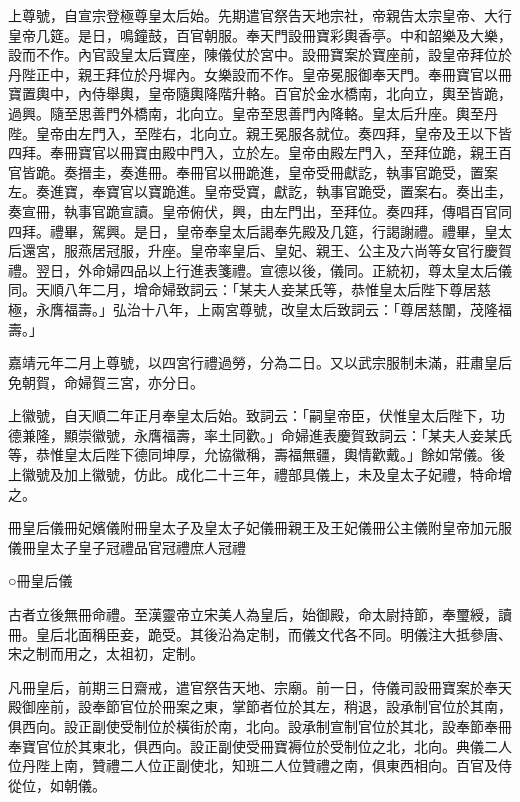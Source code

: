 上尊號，自宣宗登極尊皇太后始。先期遣官祭告天地宗社，帝親告太宗皇帝、大行皇帝几筵。是日，鳴鐘鼓，百官朝服。奉天門設冊寶彩輿香亭。中和韶樂及大樂，設而不作。內官設皇太后寶座，陳儀仗於宮中。設冊寶案於寶座前，設皇帝拜位於丹陛正中，親王拜位於丹墀內。女樂設而不作。皇帝冕服御奉天門。奉冊寶官以冊寶置輿中，內侍舉輿，皇帝隨輿降階升輅。百官於金水橋南，北向立，輿至皆跪，過興。隨至思善門外橋南，北向立。皇帝至思善門內降輅。皇太后升座。輿至丹陛。皇帝由左門入，至陛右，北向立。親王冕服各就位。奏四拜，皇帝及王以下皆四拜。奉冊寶官以冊寶由殿中門入，立於左。皇帝由殿左門入，至拜位跪，親王百官皆跪。奏搢圭，奏進冊。奉冊官以冊跪進，皇帝受冊獻訖，執事官跪受，置案左。奏進寶，奉寶官以寶跪進。皇帝受寶，獻訖，執事官跪受，置案右。奏出圭，奏宣冊，執事官跪宣讀。皇帝俯伏，興，由左門出，至拜位。奏四拜，傳唱百官同四拜。禮畢，駕興。是日，皇帝奉皇太后謁奉先殿及几筵，行謁謝禮。禮畢，皇太后還宮，服燕居冠服，升座。皇帝率皇后、皇妃、親王、公主及六尚等女官行慶賀禮。翌日，外命婦四品以上行進表箋禮。宣德以後，儀同。正統初，尊太皇太后儀同。天順八年二月，增命婦致詞云：「某夫人妾某氏等，恭惟皇太后陛下尊居慈極，永膺福壽。」弘治十八年，上兩宮尊號，改皇太后致詞云：「尊居慈闈，茂隆福壽。」

嘉靖元年二月上尊號，以四宮行禮過勞，分為二日。又以武宗服制未滿，莊肅皇后免朝賀，命婦賀三宮，亦分日。

上徽號，自天順二年正月奉皇太后始。致詞云：「嗣皇帝臣，伏惟皇太后陛下，功德兼隆，顯崇徽號，永膺福壽，率土同歡。」命婦進表慶賀致詞云：「某夫人妾某氏等，恭惟皇太后陛下德同坤厚，允協徽稱，壽福無疆，輿情歡戴。」餘如常儀。後上徽號及加上徽號，仿此。成化二十三年，禮部具儀上，未及皇太子妃禮，特命增之。

冊皇后儀冊妃嬪儀附冊皇太子及皇太子妃儀冊親王及王妃儀冊公主儀附皇帝加元服儀冊皇太子皇子冠禮品官冠禮庶人冠禮

○冊皇后儀

古者立後無冊命禮。至漢靈帝立宋美人為皇后，始御殿，命太尉持節，奉璽綬，讀冊。皇后北面稱臣妾，跪受。其後沿為定制，而儀文代各不同。明儀注大抵參唐、宋之制而用之，太祖初，定制。

凡冊皇后，前期三日齋戒，遣官祭告天地、宗廟。前一日，侍儀司設冊寶案於奉天殿御座前，設奉節官位於冊案之東，掌節者位於其左，稍退，設承制官位於其南，俱西向。設正副使受制位於橫街於南，北向。設承制宣制官位於其北，設奉節奉冊奉寶官位於其東北，俱西向。設正副使受冊寶褥位於受制位之北，北向。典儀二人位丹陛上南，贊禮二人位正副使北，知班二人位贊禮之南，俱東西相向。百官及侍從位，如朝儀。

